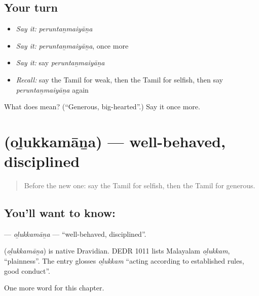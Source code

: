 \subsection*{Your turn}
\begin{itemize}
\raggedright
  \item \emph{Say it:} \emph{peruntaṉmaiyāṉa}
  \item \emph{Say it:} \emph{peruntaṉmaiyāṉa}, once more
  \item \emph{Say it:} say \emph{peruntaṉmaiyāṉa}
  \item \emph{Recall:} say the Tamil for weak, then the Tamil for selfish, then say \emph{peruntaṉmaiyāṉa} again
\end{itemize}

\begin{tcolorbox}[breakable,colback=teal!4,colframe=teal!35!black,title={Before you move on}]
What does  mean? (\textquotedblleft{}Generous, big-hearted\textquotedblright{}.) Say it once more.
\end{tcolorbox}
\section[\texorpdfstring{\ta{ஒழுக்கமான} (oḻukkamāṉa)}{ஒழுக்கமான (oḻukkamāṉa)}]{ (oḻukkamāṉa) — well-behaved, disciplined}

\label{lesson:TA-C212-olukkamana}



\begin{quote}
Before the new one: say the Tamil for selfish, then the Tamil for generous.
\end{quote}

\subsection*{You'll want to know: }
\textbf{} — \emph{oḻukkamāṉa} — \textquotedblleft{}well-behaved, disciplined\textquotedblright{}.

\begin{cousinweb}
\textbf{} (\emph{oḻukkamāṉa}) is native Dravidian. DEDR 1011 lists Malayalam \emph{oḻukkam}, \textquotedblleft{}plainness\textquotedblright{}. The entry glosses \emph{oḻukkam} \textquotedblleft{}acting according to established rules, good conduct\textquotedblright{}.
\end{cousinweb}

\begin{grammarlens}[title={What you've built}]
One more word for this chapter.
\end{grammarlens}

